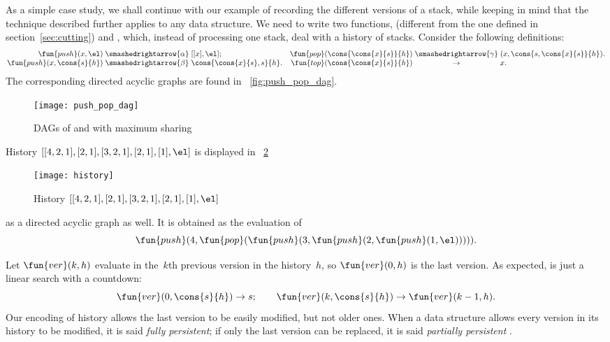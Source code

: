 As a simple case study, we shall continue with our example of
recording the different versions of a stack, while keeping in mind
that the technique described further applies to any data structure. We
need to write two functions, 
(different from the one defined in section~\ref{sec:cutting}) and
, which, instead of processing one
stack, deal with a history of stacks. Consider the following
definitions:
\begin{equation}
\begin{array}{@{}r@{\;}c@{\;}l@{\quad}r@{\;}c@{\;}l@{}}
\fun{push}(x,\el) & \smashedrightarrow{\alpha} & [[x],\el];
& \fun{pop}(\cons{\cons{x}{s}}{h}) & \smashedrightarrow{\gamma} &
                                     (x, \cons{s,\cons{x}{s}}{h}).\\
\fun{push}(x,\cons{s}{h}) & \smashedrightarrow{\beta} &
\cons{\cons{x}{s},s}{h}. &
\fun{top}(\cons{\cons{x}{s}}{h}) & \rightarrow & x.
\end{array}
\label{eq:push_pop_persistence}
\end{equation}
The corresponding directed acyclic graphs are found in
\fig~\vref{fig:push_pop_dag}.
\begin{figure}
\centering
\texttt{[image: push\_pop\_dag]}
\caption{DAGs of  and  with maximum sharing}
\label{fig:push_pop_dag}
\end{figure}
History \([[4,2,1],[2,1],[3,2,1],[2,1],[1],\el]\) is displayed in
\fig~\ref{fig:history}
\begin{figure}[!b]
\centering
\texttt{[image: history]}
\caption{History \([[4,2,1],[2,1],[3,2,1],[2,1],[1],\el]\)}
\label{fig:history}
\end{figure}
as a directed acyclic graph as well. It is obtained as the evaluation
of
\begin{equation}
\fun{push}(4, \fun{pop}(\fun{push}(3, \fun{push}(2,
\fun{push}(1, \el))))).
\label{ex:history}
\end{equation}

Let \(\fun{ver}(k,h)\)  evaluate in the~\(k\)th
previous version in the history~\(h\), so \(\fun{ver}(0,h)\) is the
last version. As expected,  is just a linear search with a
countdown:
\begin{equation*}
\fun{ver}(0,\cons{s}{h}) \rightarrow s;\qquad
\fun{ver}(k,\cons{s}{h}) \rightarrow \fun{ver}(k-1,h).
\end{equation*}
Our encoding of history allows the last version to be easily modified,
but not older ones. When a data structure allows every version in its
history to be modified, it is said \emph{fully
  persistent}; if only the last version
can be replaced, it is said \emph{partially persistent}
\citep{MehlhornTsakalidis_1990}.

